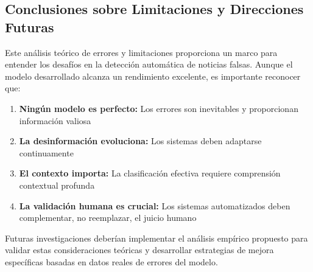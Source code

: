 \begin{table}[htbp]
\centering
{}
\caption{Estrategias propuestas para abordar limitaciones identificadas.}
\label{tab:estrategias_mejora}
\end{table}

\subsection{Conclusiones sobre Limitaciones y Direcciones Futuras}

Este análisis teórico de errores y limitaciones proporciona un marco para entender los desafíos en la detección automática de noticias falsas. Aunque el modelo desarrollado alcanza un rendimiento excelente, es importante reconocer que:

\begin{enumerate}
    \item \textbf{Ningún modelo es perfecto:} Los errores son inevitables y proporcionan información valiosa
    \item \textbf{La desinformación evoluciona:} Los sistemas deben adaptarse continuamente
    \item \textbf{El contexto importa:} La clasificación efectiva requiere comprensión contextual profunda
    \item \textbf{La validación humana es crucial:} Los sistemas automatizados deben complementar, no reemplazar, el juicio humano
\end{enumerate}

Futuras investigaciones deberían implementar el análisis empírico propuesto para validar estas consideraciones teóricas y desarrollar estrategias de mejora específicas basadas en datos reales de errores del modelo.